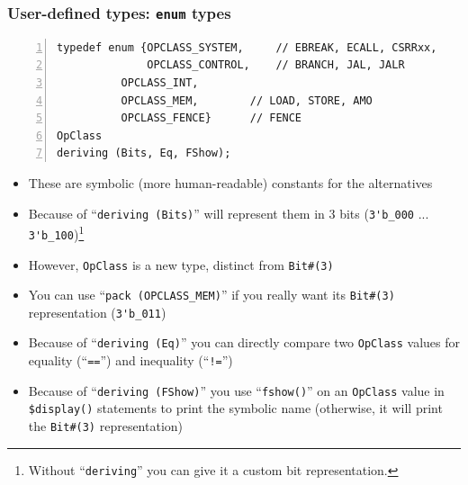\begin{frame}[fragile]
\frametitle{User-defined types: {\tt enum} types}

\footnotesize

\begin{Verbatim}[frame=single, numbers=left]
typedef enum {OPCLASS_SYSTEM,     // EBREAK, ECALL, CSRRxx,
              OPCLASS_CONTROL,    // BRANCH, JAL, JALR
	      OPCLASS_INT,
	      OPCLASS_MEM,        // LOAD, STORE, AMO
	      OPCLASS_FENCE}      // FENCE
OpClass
deriving (Bits, Eq, FShow);
\end{Verbatim}

\vspace{2ex}

\begin{itemize}
 \item These are symbolic (more human-readable) constants for the alternatives

 \item Because of ``\verb|deriving (Bits)|'' {\bsc} will represent
       them in 3 bits (\verb|3'b_000| ... \verb|3'b_100|)\footnote{
       Without ``{\tt deriving}'' you can give it a custom bit representation.}

 \item However, \verb|OpClass| is a new type, distinct from \verb|Bit#(3)|

 \item You can use ``\verb|pack (OPCLASS_MEM)|'' if you really want its
       \verb|Bit#(3)| representation (\verb|3'b_011|)

 \vspace{2ex}

 \item Because of ``\verb|deriving (Eq)|'' you can directly compare
       two \verb|OpClass| values for equality (``\verb|==|'') and
       inequality (``\verb|!=|'')

 \item Because of ``\verb|deriving (FShow)|'' you use
       ``\verb|fshow()|'' on an \verb|OpClass| value in
       \verb|$display()| statements to print the symbolic name
       (otherwise, it will print the \verb|Bit#(3)| representation)

\end{itemize}

\end{frame}


